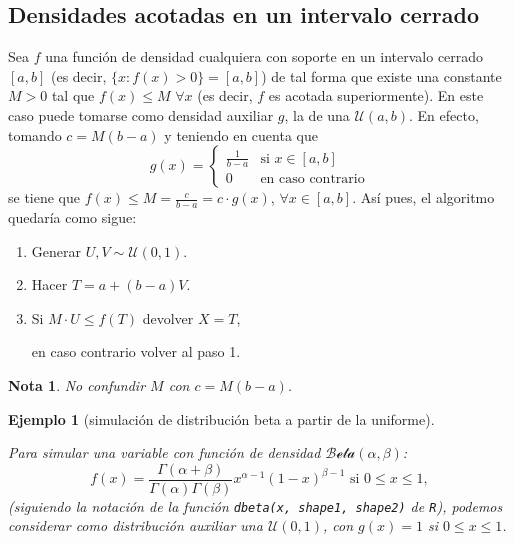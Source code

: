 \documentclass[
]{book}
\theoremstyle{break}
\newtheorem{example}{Ejemplo}[chapter]
\theoremstyle{nonumberplain}
\newtheorem{remark}{Nota}
\begin{document}
\hypertarget{densidades-acotadas-en-un-intervalo-cerrado}{%
\subsection{Densidades acotadas en un intervalo cerrado}\label{densidades-acotadas-en-un-intervalo-cerrado}}

Sea \(f\) una función de densidad cualquiera con soporte en un intervalo cerrado \([a,b]\) (es decir, \(\{x : f(x) > 0\}=[a,b]\)) de tal forma que existe una constante \(M>0\) tal que \(f(x) \leq M\) \(\forall x\) (es decir, \(f\) es acotada superiormente).
En este caso puede tomarse como densidad auxiliar \(g\), la de una \(\mathcal{U}(a,b)\).
En efecto, tomando \(c = M\left( b-a\right)\) y teniendo en cuenta que
\[g(x) = \left\{
\begin{array}{ll}\frac{1}{b-a} & \text{si } x \in [a,b]\\
0 & \text{en caso contrario}
\end{array} \right.\]
se tiene que \(f(x) \leq M = \frac{c}{b-a}=c \cdot g(x)\),
\(\forall x \in [a,b]\).
Así pues, el algoritmo quedaría como sigue:

\begin{enumerate}
\def\labelenumi{\arabic{enumi}.}
\item
  Generar \(U,V\sim \mathcal{U}(0, 1)\).
\item
  Hacer \(T = a + \left( b-a \right) V\).
\item
  Si \(M \cdot U\leq f\left( T \right)\)
  devolver \(X = T\),

  en caso contrario volver al paso 1.
\end{enumerate}

\begin{remark}
No confundir \(M\) con \(c = M \left( b - a \right)\).
\end{remark}

\begin{example}[simulación de distribución beta a partir de la uniforme]
\protect\hypertarget{exm:dbeta-dunif-ar}{}\label{exm:dbeta-dunif-ar}

Para simular una variable con función de densidad \(\mathcal{Beta}(\alpha, \beta)\):
\[f(x)=\frac{\Gamma (\alpha + \beta )}{\Gamma (\alpha )\Gamma (\beta )}
x^{\alpha -1}(1-x)^{\beta -1}\text{ si }0 \leq x \leq 1,\]
(siguiendo la notación de la función \texttt{dbeta(x,\ shape1,\ shape2)} de \texttt{R}), podemos considerar como distribución auxiliar una \(\mathcal{U}(0,1)\),
con \(g(x) = 1\) si \(0 \leq x \leq 1\).
\end{example}
\end{document}

